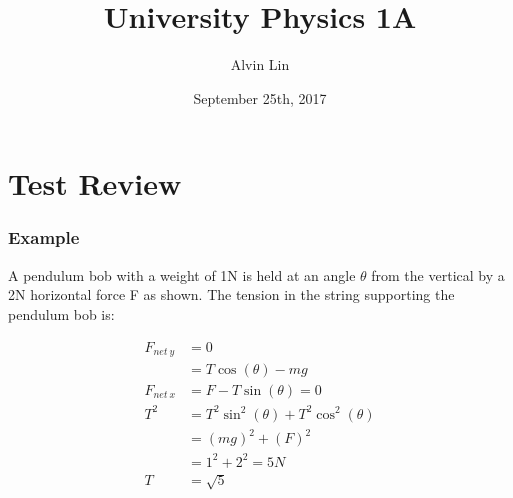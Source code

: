 \documentclass[letterpaper, 12pt]{math}
\title{University Physics 1A}
\author{Alvin Lin}
\date{September 25th, 2017}
\begin{document}
\maketitle

\section*{Test Review}

\subsubsection*{Example}
A pendulum bob with a weight of 1N is held at an angle \( \theta \) from the
vertical by a 2N horizontal force F as shown. The tension in the string
supporting the pendulum bob is:
\begin{center}
\end{center}
\begin{align*}
  F_{net\ y} &= 0 \\
  &= T\cos(\theta)-mg \\
  F_{net\ x} &= F-T\sin(\theta) = 0 \\
  T^2 &= T^2\sin^2(\theta)+T^2\cos^2(\theta) \\
  &= (mg)^2+(F)^2 \\
  &= 1^2+2^2 = 5N \\
  T &= \sqrt{5}
\end{align*}
\end{document}

